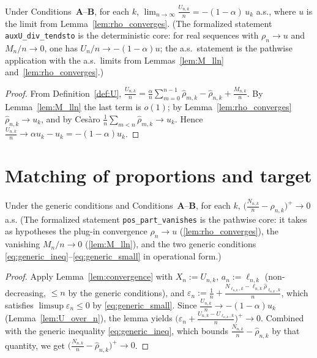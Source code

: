 \begin{lemma}[Limit of $U/n$]\label{lem:U_over_n}
\leanok
{}
Under Conditions~\textbf{A}--\textbf{B}, for each $k$,
$\displaystyle \lim_{n\to\infty} \frac{U_{n,k}}{n} = -(1-\alpha)\,u_k$ a.s.,
where $u$ is the limit from Lemma~\ref{lem:rho_converges}. (The formalized statement
\texttt{auxU\_div\_tendsto} is the deterministic core: for real sequences with $\rho_n\to u$ and
$M_n/n\to0$, one has $U_n/n\to-(1-\alpha)u$; the a.s.\ statement is the pathwise application with the
a.s.\ limits from Lemmas~\ref{lem:M_lln} and~\ref{lem:rho_converges}.)
\end{lemma}

\begin{proof}\leanok
{}
From Definition~\ref{def:U},
$\frac{U_{n,k}}{n} = \frac{\alpha}{n}\sum_{m=0}^{n-1}\hat{\rho}_{m,k}
 - \hat{\rho}_{n,k} + \frac{M_{n,k}}{n}$.
By Lemma~\ref{lem:M_lln} the last term is $o(1)$; by Lemma~\ref{lem:rho_converges}
$\hat{\rho}_{n,k}\to u_k$, and by Cesàro
$\frac1n\sum_{m<n}\hat{\rho}_{m,k}\to u_k$. Hence
$\frac{U_{n,k}}{n} \to \alpha u_k - u_k = -(1-\alpha)u_k$.
\end{proof}

\section{Matching of proportions and target}
\label{sec:cons_match}

\begin{lemma}\label{lem:pos_part_vanishes}
\leanok
{}
Under the generic conditions and Conditions~\textbf{A}--\textbf{B}, for each $k$,
$\big(\frac{N_{n,k}}{n} - \hat{\rho}_{n,k}\big)^+ \to 0$ a.s. (The formalized statement
\texttt{pos\_part\_vanishes} is the pathwise core: it takes as hypotheses the plug-in convergence
$\rho_n\to u$ (\ref{lem:rho_converges}), the vanishing $M_n/n\to0$ (\ref{lem:M_lln}), and the two
generic conditions \eqref{eq:generic_ineq}--\eqref{eq:generic_small} in operational form.)
\end{lemma}

\begin{proof}\leanok
{}
Apply Lemma~\ref{lem:convergence} with $X_n := U_{n,k}$, $a_n := \ell_{n,k}$
(non-decreasing, $\le n$ by the generic conditions), and
$\varepsilon_n := \frac1n + \frac{N_{\ell_{n,k},k}-\ell_{n,k}\hat{\rho}_{\ell_{n,k},k}}{n}$,
which satisfies $\limsup\varepsilon_n \le 0$ by \eqref{eq:generic_small}. Since
$\frac{U_{n,k}}{n}\to -(1-\alpha)u_k$ (Lemma~\ref{lem:U_over_n}), the lemma yields
$\big(\varepsilon_n + \frac{U_{n,k}-U_{\ell_{n,k},k}}{n}\big)^+ \to 0$. Combined
with the generic inequality \eqref{eq:generic_ineq}, which bounds
$\frac{N_{n,k}}{n}-\hat{\rho}_{n,k}$ by that quantity, we get
$\big(\frac{N_{n,k}}{n}-\hat{\rho}_{n,k}\big)^+\to0$.
\end{proof}

